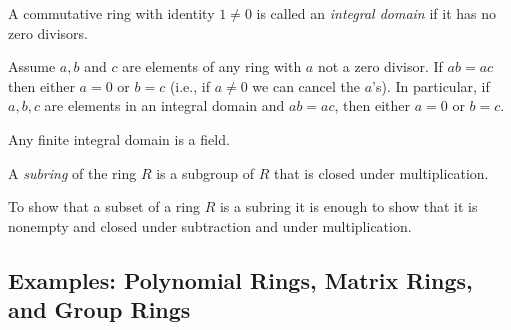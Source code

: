 \documentclass[../main]{subfiles}
\begin{document}
\begin{dfn}
 A commutative ring with identity $1 \neq 0$ is called an \textit{integral domain} if it has no zero divisors.
\end{dfn}


\begin{prop}
 Assume $a,b$ and $c$ are elements of any ring with $a$ not a zero divisor. If $ab = ac$ then either $a = 0$ or $b = c$ (i.e., if $a \neq 0$ we can cancel the $a$'s). In particular, if $a,b,c$ are elements in an integral domain and $ab = ac$, then either $a = 0$ or $b = c$.
\end{prop}


\begin{cor}
 Any finite integral domain is a field.
\end{cor}


\begin{dfn}
 A \textit{subring} of the ring $R$ is a subgroup of $R$ that is closed under multiplication.
\end{dfn}


\begin{nt}
 To show that a subset of a ring $R$ is a subring it is enough to show that it is nonempty and closed under subtraction and under multiplication.
\end{nt}


\subsection{Examples: Polynomial Rings, Matrix Rings, and Group Rings}










 
 
 
 
 
 
 
 
 
 
 
 
 
 
 
 
 
 
 
 
 
 
 
 
 
\end{document}
